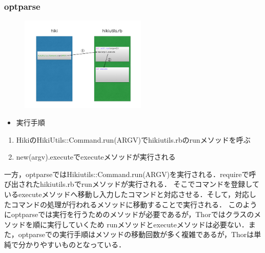 \subsubsection{optparse}
\begin{figure}[htbp]\begin{center}
\includegraphics[width=6cm,bb=0 0 442 500]{../figs/./hikiutils_yamane_09_copy.007.jpg}
\caption{}
\label{default}\end{center}\end{figure}\begin{itemize}
\item 実行手順
\end{itemize}\begin{enumerate}
\item HikiのHikiUtils::Command.run(ARGV)でhikiutils.rbのrunメソッドを呼ぶ
\item new(argv).executeでexecuteメソッドが実行される
\end{enumerate}
一方，optparseではHikiutils::Command.run(ARGV)を実行される．requireで呼び出されたhikiutils.rbでrunメソッドが実行される．
そこでコマンドを登録しているexecuteメソッドへ移動し入力したコマンドと対応させる．そして，対応したコマンドの処理が行われるメソッドに移動することで実行される．
このようにoptparseでは実行を行うためのメソッドが必要であるが，Thorではクラスのメソッドを順に実行していくため
runメソッドとexecuteメソッドは必要ない．また，optparseでの実行手順はメソッドの移動回数が多く複雑であるが，Thorは単純で分かりやすいものとなっている．


